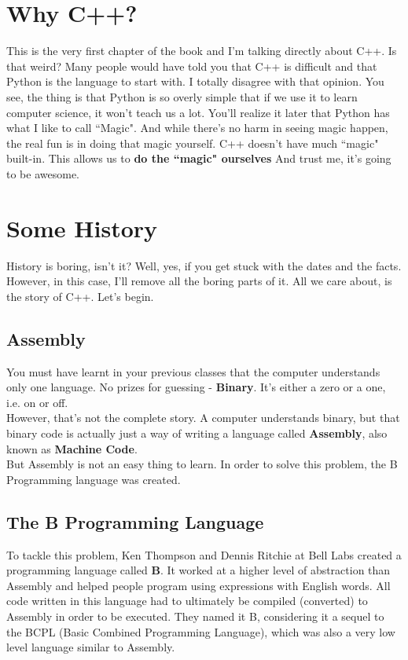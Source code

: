 \documentclass[letterpaper, 12pt]{book}
\begin{document}
\section{Why C++?}
This is the very first chapter of the book and I'm talking directly about C++. Is that weird? Many people would have told you that C++ is difficult and that Python is the language to start with. I totally disagree with that opinion. You see, the thing is that Python is so overly simple that if we use it to learn computer science, it won't teach us a lot. You'll realize it later that Python has what I like to call ``Magic". And while there's no harm in seeing magic happen, the real fun is in doing that magic yourself. C++ doesn't have much ``magic" built-in. This allows us to \textbf{do the ``magic" ourselves} And trust me, it's going to be awesome.
\section{Some History}
History is boring, isn't it? Well, yes, if you get stuck with the dates and the facts. However, in this case, I'll remove all the boring parts of it. All we care about, is the story of C++. Let's begin.
\subsection{Assembly}
You must have learnt in your previous classes that the computer understands only one language. No prizes for guessing - \textbf{Binary}. It's either a zero or a one, i.e. on or off.\\
However, that's not the complete story. A computer understands binary, but that binary code is actually just a way of writing a language called \textbf{Assembly}, also known as \textbf{Machine Code}.\\ 
But Assembly is not an easy thing to learn. In order to solve this problem, the B Programming language was created.
\subsection{The B Programming Language}
To tackle this problem, Ken Thompson and Dennis Ritchie at Bell Labs created a programming language called \textbf{B}. It worked at a higher level of abstraction than Assembly and helped people program using expressions with English words. All code written in this language had to ultimately be compiled (converted) to Assembly in order to be executed. They named it B, considering it a sequel to the BCPL (Basic Combined Programming Language), which was also a very low level language similar to Assembly.
\end{document}
